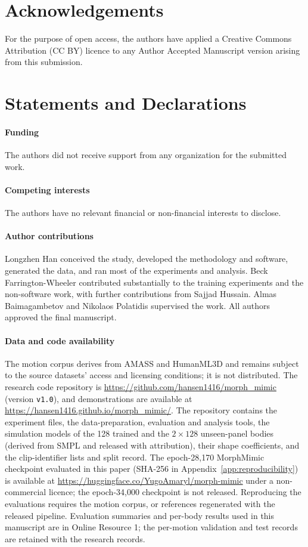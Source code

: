 \section*{Acknowledgements}
For the purpose of open access, the authors have applied a Creative Commons
Attribution (CC BY) licence to any Author Accepted Manuscript version arising
from this submission.

\section*{Statements and Declarations}
\paragraph{Funding}
The authors did not receive support from any organization for the submitted work.

\paragraph{Competing interests}
The authors have no relevant financial or non-financial interests to disclose.

\paragraph{Author contributions}
Longzhen Han conceived the study, developed the methodology and software,
generated the data, and ran most of the experiments and analysis. Beck
Farrington-Wheeler contributed substantially to the training
experiments and the non-software work, with further contributions from Sajjad
Hussain. Almas Baimagambetov and Nikolaos Polatidis supervised the work. All authors approved the final manuscript.

\paragraph{Data and code availability}
The motion corpus derives from AMASS and HumanML3D and remains subject to
the source datasets' access and licensing conditions; it is not distributed.
The research code repository is \url{https://github.com/hansen1416/morph_mimic}
(version \texttt{v1.0}), and demonstrations are available at
\url{https://hansen1416.github.io/morph_mimic/}. The repository contains the
experiment files, the data-preparation, evaluation and analysis tools, the
simulation models of the 128 trained and the $2\times128$ unseen-panel bodies
(derived from SMPL and released with attribution), their shape coefficients, and
the clip-identifier lists and split record. The epoch-28,170 MorphMimic checkpoint
evaluated in this paper (SHA-256 in Appendix~\ref{app:reproducibility}) is available at
\url{https://huggingface.co/YugoAmaryl/morph-mimic} under a non-commercial licence;
the epoch-34,000 checkpoint is not released. Reproducing the evaluations requires
the motion corpus, or references regenerated with the released pipeline.
Evaluation summaries and per-body results used in this manuscript are in
Online Resource 1; the per-motion validation and test records are retained with
the research records.

